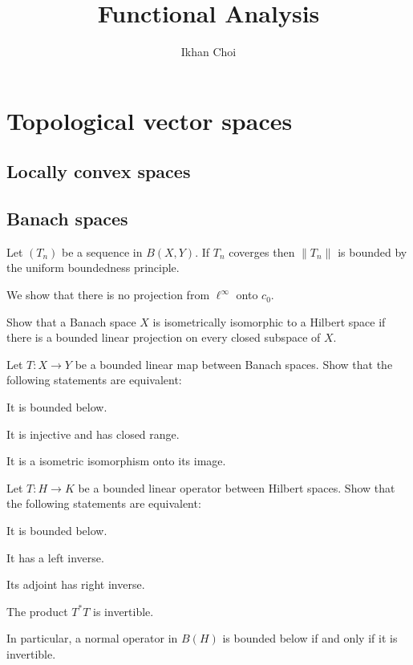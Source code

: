 \documentclass{../note}
\begin{document}
\title{Functional Analysis}
\author{Ikhan Choi}
\maketitle
\tableofcontents

\part{Topological vector spaces}

\chapter{Locally convex spaces}

\chapter{Banach spaces}


\begin{prb}
Let $(T_n)$ be a sequence in $B(X,Y)$.
If $T_n$ coverges then $\|T_n\|$ is bounded by the uniform boundedness principle.
\end{prb}





\begin{prb}
We show that there is no projection from $\ell^\infty$ onto $c_0$.
\begin{parts}
\item
Show that a Banach space $X$ is isometrically isomorphic to a Hilbert space if there is a bounded linear projection on every closed subspace of $X$.
\end{parts}
\end{prb}





\begin{prb}
Let $T:X\to Y$ be a bounded linear map between Banach spaces.
Show that the following statements are equivalent:
\begin{parts}
\item It is bounded below.
\item It is injective and has closed range.
\item It is a isometric isomorphism onto its image.
\end{parts}
\end{prb}


\begin{prb}
Let $T:H\to K$ be a bounded linear operator between Hilbert spaces.
Show that the following statements are equivalent:
\begin{parts}
\item It is bounded below.
\item It has a left inverse.
\item Its adjoint has right inverse.
\item The product $T^*T$ is invertible.
\end{parts}
In particular, a normal operator in $B(H)$ is bounded below if and only if it is invertible.
\end{prb}
\end{document}
